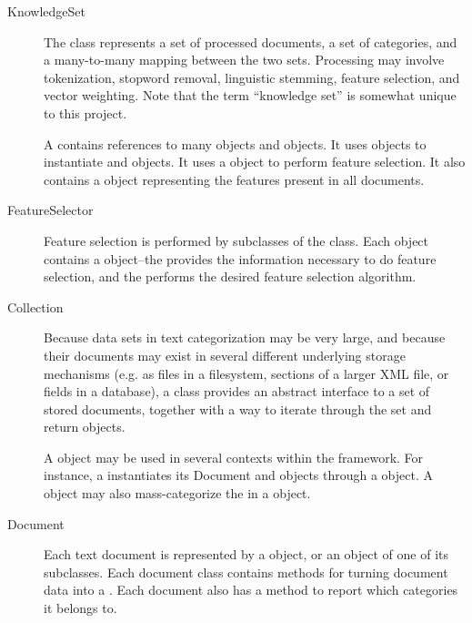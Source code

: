 \begin{description}

\item[KnowledgeSet]

The  class represents a set of processed documents, a set
of categories, and a many-to-many mapping between the two sets.
Processing may involve tokenization, stopword removal, linguistic
stemming, feature selection, and vector weighting.  Note that the term
``knowledge set'' is somewhat unique to this project.

A  contains references to many  objects and
 objects.  It uses  objects to instantiate 
and  objects.  It uses a  object to perform
feature selection.  It also contains a  object
representing the features present in all documents.

\item[FeatureSelector]

Feature selection is performed by subclasses of the 
class.  Each  object contains a 
object--the  provides the information necessary to do
feature selection, and the  performs the desired
feature selection algorithm.

\item[Collection]

Because data sets in text categorization may be very large, and
because their documents may exist in several different underlying
storage mechanisms (e.g. as files in a filesystem, sections of a
larger XML file, or fields in a database), a  class provides
an abstract interface to a set of stored documents, together with a
way to iterate through the set and return  objects.

A  object may be used in several contexts within the
framework.  For instance, a  instantiates its Document and
 objects through a  object.  A  object may
also mass-categorize the  in a  object.

\item[Document]

Each text document is represented by a  object, or an object
of one of its subclasses.  Each document class contains methods for
turning document data into a .  Each document also has
a method to report which categories it belongs to.


\end{description}
